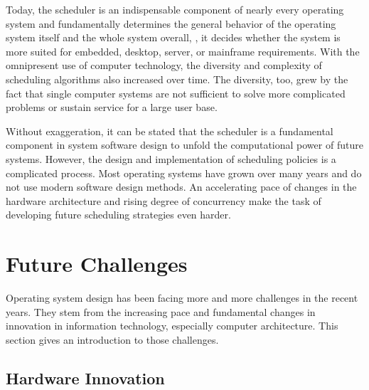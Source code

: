 Today, the scheduler is an indispensable component of nearly every operating system and fundamentally determines the general behavior of the operating system itself and the whole system overall, \eg, it decides whether the system is more suited for embedded, desktop, server, or mainframe requirements. With the omnipresent use of computer technology, the diversity and complexity of scheduling algorithms also increased over time. The diversity, too, grew by the fact that single computer systems are not sufficient to solve more complicated problems or sustain service for a large user base.

Without exaggeration, it can be stated that the scheduler is a fundamental component in system software design to unfold the computational power of future systems. However, the design and implementation of scheduling policies is a complicated process. Most operating systems have grown over many years and do not use modern software design methods. An accelerating pace of changes in the hardware architecture and rising degree of concurrency make the task of developing future scheduling strategies even harder.

\section{Future Challenges}%
\label{sec:intro:challenges}

Operating system design has been facing more and more challenges in the recent years. They stem from the increasing pace and fundamental changes in innovation in information technology, especially computer architecture. This section gives an introduction to those challenges.

\subsection{Hardware Innovation}%
\label{sec:intro:challenges:innovation}

